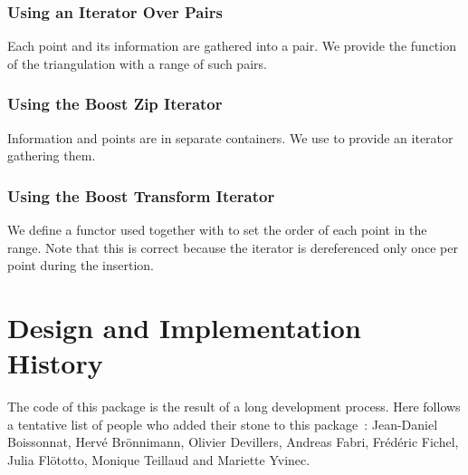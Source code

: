 \subsubsection{Using an Iterator Over Pairs}
Each point and its information are gathered into a pair. We provide
the  function of the triangulation with a range of such pairs.


\subsubsection{Using the Boost Zip Iterator}

Information and points are in separate containers. We use
{} to provide an iterator gathering them.


\subsubsection{Using the Boost Transform Iterator}

We define a functor  used together with
{} to set the order of each point
in the range. Note that this is correct because the iterator
is dereferenced only once per point during the insertion.


\section{Design and Implementation History}

The code of this package is the result of a long development
process. Here follows a tentative list of people
who added their stone to this package~:
Jean-Daniel Boissonnat, Herv\'e Br\"onnimann, 
Olivier Devillers, Andreas Fabri, Fr\'ed\'eric Fichel,
Julia Fl\"ototto, Monique Teillaud and Mariette Yvinec.






